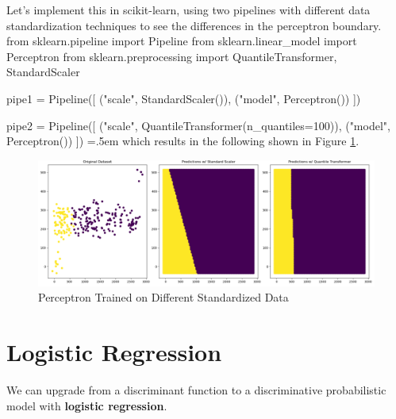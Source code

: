 \documentclass{article}
\newenvironment{cverbatim}
 {\SaveVerbatim{cverb}}
 {\endSaveVerbatim
  \flushleft\fboxrule=0pt\fboxsep=.5em
  \colorbox{cverbbg}{%
    \makebox[\dimexpr\linewidth-2\fboxsep][l]{\BUseVerbatim{cverb}}%
  }
  \endflushleft
}
\theoremstyle{definition}
\theoremstyle{remark}
\theoremstyle{definition}
\begin{document}
Let's implement this in scikit-learn, using two pipelines with different data standardization techniques to see the differences in the perceptron boundary. 
\begin{cverbatim}
from sklearn.pipeline import Pipeline 
from sklearn.linear_model import Perceptron
from sklearn.preprocessing import QuantileTransformer, StandardScaler

pipe1 = Pipeline([ 
    ("scale", StandardScaler()), 
    ("model", Perceptron())
])

pipe2 = Pipeline([
    ("scale", QuantileTransformer(n_quantiles=100)), 
    ("model", Perceptron())
])
\end{cverbatim}
which results in the following shown in Figure \ref{fig:Percepton_on_Standardized_data}. 
\begin{figure}[hbt!]
    \centering
    \includegraphics[scale=0.4]{Section_3/Perceptron.png}
    \caption{Perceptron Trained on Different Standardized Data}
    \label{fig:Percepton_on_Standardized_data}
\end{figure}


\section{Logistic Regression}

We can upgrade from a discriminant function to a discriminative probabilistic model with \textbf{logistic regression}. 
\end{document}
